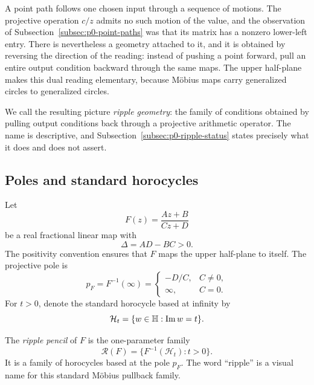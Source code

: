 A point path follows one chosen input through a sequence of motions.  The
projective operation $c/z$ admits no such motion of the value, and the
observation of Subsection~\ref{subsec:p0-point-paths} was that its matrix has a
nonzero lower-left entry.  There is nevertheless a geometry attached to it, and
it is obtained by reversing the direction of the reading: instead of pushing a
point forward, pull an entire output condition backward through the same maps.
The upper half-plane makes this dual reading elementary, because M\"obius maps
carry generalized circles to generalized circles.

We call the resulting picture \emph{ripple geometry}: the family of conditions
obtained by pulling output conditions back through a projective arithmetic
operator.  The name is descriptive, and
Subsection~\ref{subsec:p0-ripple-status} states precisely what it does and does
not assert.

\subsection{Poles and standard horocycles}

Let
\begin{equation}\label{eq:p0-mobius-map}
  F(z)=\frac{Az+B}{Cz+D}
\end{equation}
be a real fractional linear map with
\[
  \Delta=AD-BC>0.
\]
The positivity convention ensures that $F$ maps the upper half-plane to itself.
The projective pole is
\[
  p_F=F^{-1}(\infty)
  =\begin{cases}
     -D/C,&C\ne0,\\
     \infty,&C=0.
   \end{cases}
\]
For $t>0$, denote the standard horocycle based at infinity by
\[
  \mathcal H_t=\{w\in\mathbb H:\operatorname{Im} w=t\}.
\]

\begin{definition}
\label{def:p0-ripple-pencil}
The \emph{ripple pencil} of $F$ is the one-parameter family
\[
  \mathcal R(F)
  =\{F^{-1}(\mathcal H_t):t>0\}.
\]
It is a family of horocycles based at the pole $p_F$.  The word ``ripple'' is a
visual name for this standard M\"obius pullback family.
\end{definition}

